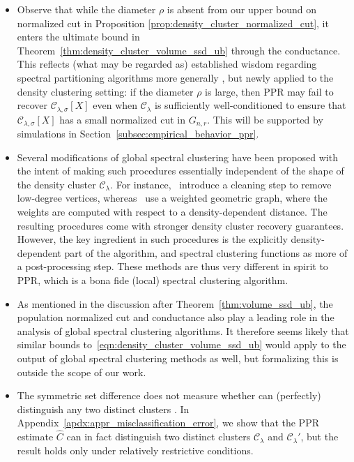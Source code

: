 \documentclass[11pt,twoside]{article}
\newcommand{\1}{\mathbf{1}}
\newcommand{\mc}[1]{\mathcal{#1}}
\newcommand{\wh}[1]{\widehat{#1}}
\begin{document}
\begin{itemize}
	\item Observe that while the diameter $\rho$ is absent from our upper bound on normalized cut in Proposition \ref{prop:density_cluster_normalized_cut}, it enters the ultimate bound in Theorem~\ref{thm:density_cluster_volume_ssd_ub} through the conductance. This reflects
	(what may be regarded as) established wisdom regarding spectral partitioning
	algorithms more generally \citep{guattery1995, hein2010}, but newly applied
	to the density clustering setting: if the diameter $\rho$ is large, then PPR
	may fail to recover $\mc{C}_{\lambda,\sigma}[X]$ even when $\mc{C}_{\lambda}$ is sufficiently well-conditioned to ensure that $\mc{C}_{\lambda,\sigma}[X]$ has a small normalized cut in $G_{n,r}$. This will be supported by simulations in Section~\ref{subsec:empirical_behavior_ppr}.   
	\item Several modifications of global spectral clustering have been proposed with the intent of making such procedures essentially independent of the shape of the density cluster $\mc{C}_{\lambda}$. For instance,~\citet{arias-castro2009,pelletier2011} introduce a cleaning step to remove low-degree vertices, whereas~\cite{little2020} use a weighted geometric graph, where the weights are computed with respect to a density-dependent distance. The resulting procedures come with stronger density cluster recovery guarantees. However, the key ingredient in such procedures is the explicitly density-dependent part of the algorithm, and spectral clustering functions as more of a post-processing step. These methods are thus very different in spirit to PPR, which is a bona fide (local) spectral clustering algorithm. 
	\item As mentioned in the discussion after Theorem~\ref{thm:volume_ssd_ub}, the population normalized cut and conductance also play a leading role in the analysis of global spectral clustering algorithms. It therefore seems likely that similar bounds to~\eqref{eqn:density_cluster_volume_ssd_ub} would apply to the output of global spectral clustering methods as well, but formalizing this is outside the scope of our work.
	\item The symmetric set difference does not measure whether \smash{$\wh{C}$}
	can (perfectly) distinguish any two distinct clusters \smash{$\mc{C}_{\lambda},\mc{C}_{\lambda}' \in \mathbb{C}_f(\lambda)$}. In Appendix~\ref{apdx:appr_misclassification_error}, we show that the PPR estimate $\wh{C}$ can in fact distinguish two distinct clusters $\mc{C}_{\lambda}$ and $\mc{C}_{\lambda}'$, but the result holds only under relatively restrictive conditions.
\end{itemize}
\end{document}
